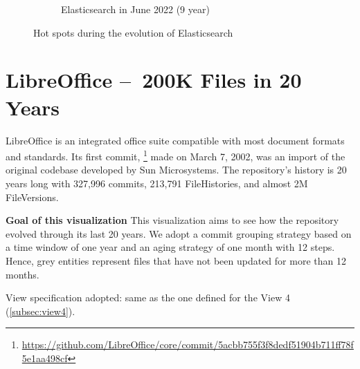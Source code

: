 \begin{figure}[ht]
\begin{subfigure}{0.48\textwidth}
        \caption{Elasticsearch in June 2022 (9 year)} 
        \label{fig:Elastic_V5_S6}
    \end{subfigure}
    
    \caption{Hot spots during the evolution of Elasticsearch} 
    \label{fig:Elastic_V5}
\end{figure}


\clearpage
\section{LibreOffice – 200K Files in 20 Years}
LibreOffice is an integrated office suite compatible with most document formats and standards. Its first commit, \footnote{\url{https://github.com/LibreOffice/core/commit/5acbb755f3f8dedf51904b711ff78f5e1aa498cf}} made on March 7, 2002, was an import of the original codebase developed by Sun Microsystems. The repository's history is 20 years long with 327,996 commits, 213,791 FileHistories, and almost 2M FileVersions. 

\bigbreak
\textbf{Goal of this visualization}
This visualization aims to see how the repository evolved through its last 20 years. We adopt a commit grouping strategy based on a time window of one year and an aging strategy of one month with 12 steps. Hence, grey entities represent files that have not been updated for more than 12 months. 


View specification adopted: same as the one defined for the View 4 (\autoref{subsec:view4}).

